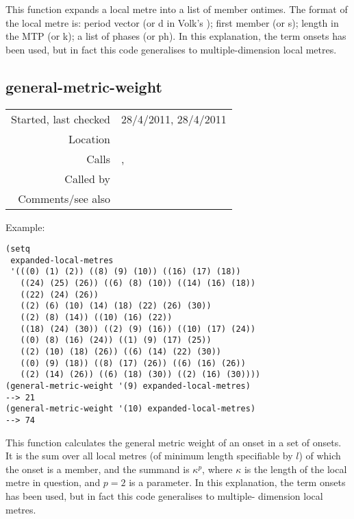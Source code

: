 \noindent This function expands a local metre
\citep{volk2008} into a list of member ontimes. The
format of the local metre is: period vector (or d in
Volk's \citeyear{volk2008}); first member (or s); length
in the MTP (or k); a list of phases (or ph). In this
explanation, the term onsets has been used, but in fact
this code generalises to multiple-dimension local
metres.


\subsection*{general-metric-weight}\label{fun:general-metric-weight}

\vspace{0.3cm}
\begin{tabular}{r|p{8cm}}
Started, last checked & 28/4/2011, 28/4/2011 \\
Location & \nameref{sec:inner-metric-analysis} \\
Calls & \nameref{fun:fibonacci-list}, \nameref{fun:my-last} \\
Called by & \nameref{fun:general-metric-weights} \\
Comments/see also & 
\end{tabular}

\vspace{0.5cm}
\noindent Example:
\begin{verbatim}
(setq
 expanded-local-metres
 '(((0) (1) (2)) ((8) (9) (10)) ((16) (17) (18))
   ((24) (25) (26)) ((6) (8) (10)) ((14) (16) (18))
   ((22) (24) (26))
   ((2) (6) (10) (14) (18) (22) (26) (30))
   ((2) (8) (14)) ((10) (16) (22))
   ((18) (24) (30)) ((2) (9) (16)) ((10) (17) (24))
   ((0) (8) (16) (24)) ((1) (9) (17) (25))
   ((2) (10) (18) (26)) ((6) (14) (22) (30))
   ((0) (9) (18)) ((8) (17) (26)) ((6) (16) (26))
   ((2) (14) (26)) ((6) (18) (30)) ((2) (16) (30))))
(general-metric-weight '(9) expanded-local-metres)
--> 21
(general-metric-weight '(10) expanded-local-metres)
--> 74
\end{verbatim}

\noindent This function calculates the general metric
weight \citep{volk2008} of an onset in a set of onsets.
It is the sum over all local metres (of minimum length
specifiable by $l$) of which the onset is a member, and
the summand is $\kappa^p$, where $\kappa$ is the length
of the local metre in question, and $p = 2$ is a
parameter. In this explanation, the term onsets has been
used, but in fact this code generalises to multiple-
dimension local metres.


